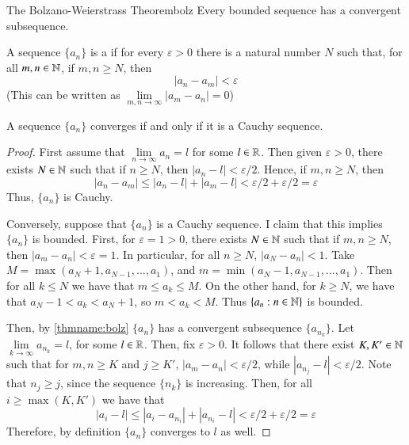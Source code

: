 \begin{cor}{The Bolzano-Weierstrass Theorem}{bolz}
    Every bounded sequence has a convergent subsequence.
\end{cor}


\begin{defn}
    A sequence $\{a_n\}$ is a  if for every $\varepsilon > 0$ there is a natural number $N$ such that, for all $m,n \in \mathbb N$, if $m,n \geq N$, then \begin{equation*}
        |a_n-a_m| <\varepsilon
    \end{equation*}
    (This can be written as $\lim\limits_{m,n\rightarrow \infty}|a_m-a_n| = 0$)
\end{defn}


\begin{thm}
    A sequence $\{a_n\}$ converges if and only if it is a Cauchy sequence.
\end{thm}
\begin{proof}
    First assume that $\lim\limits_{n\rightarrow \infty}a_n = l$ for some $l \in \mathbb R$. Then given $\varepsilon > 0$, there exists $N \in \mathbb N$ such that if $n \geq N$, then $|a_n - l| < \varepsilon/2$. Hence, if $m,n \geq N$, then $$|a_n - a_m| \leq |a_n - l| + |a_m-l| < \varepsilon/2+\varepsilon/2 = \varepsilon$$
    Thus, $\{a_n\}$ is Cauchy.

    Conversely, suppose that $\{a_n\}$ is a Cauchy sequence. I claim that this implies $\{a_n\}$ is bounded. First, for $\varepsilon = 1 > 0$, there exists $N \in \mathbb N$ such that if $m,n \geq N$, then $|a_m-a_n| < \varepsilon = 1$. In particular, for all $n \geq N$, $|a_N - a_n| < 1$. Take $M = \max(a_N + 1, a_{N-1},...,a_1)$, and $m = \min(a_N - 1, a_{N-1},...,a_1)$. Then for all $k \leq N$ we have that $m \leq a_k \leq M$. On the other hand, for $k \geq N$, we have that $a_N - 1 < a_k < a_N + 1$, so $m < a_k < M$. Thus $\{a_n:n \in \mathbb N\}$ is bounded. 

    Then, by \ref{thmname:bolz} $\{a_n\}$ has a convergent subsequence $\{a_{n_k}\}$. Let $\lim\limits_{k\rightarrow \infty}a_{n_k} = l$, for some $l \in \mathbb R$. Then, fix $\varepsilon > 0$. It follows that there exist $K, K' \in \mathbb N$ such that for $m,n \geq K$ and $j \geq K'$, $|a_m - a_n| < \varepsilon/2$, while $|a_{n_j} - l| < \varepsilon/2$. Note that $n_j \geq j$, since the sequence $\{n_k\}$ is increasing. Then, for all $i \geq \max(K,K')$ we have that \begin{equation*}
        |a_i - l| \leq |a_i - a_{n_i}| + |a_{n_i} - l| < \varepsilon/2 + \varepsilon/2 = \varepsilon
    \end{equation*}
    Therefore, by definition $\{a_n\}$ converges to $l$ as well.
\end{proof}


